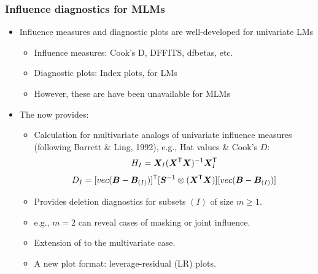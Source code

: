 \begin{frame}
  \frametitle{Influence diagnostics for MLMs}

  \begin{itemize}
  \item<1-> Influence measures and diagnostic plots are well-developed for univariate LMs
    \begin{itemize}
    \item Influence measures: Cook's D, DFFITS, dfbetas, etc.
    \item Diagnostic plots:  Index plots,  for LMs
    \item However, these are have been unavailable for MLMs  
    \end{itemize}
  \item<2->
    The  now provides:
    \begin{itemize}
    \item Calculation for multivariate analogs of univariate influence measures
    (following Barrett \& Ling, 1992), e.g., Hat values \& Cook's $D$:
    \begin{equation}
    	H_I = \bm{X}_I
    	      (\bm{X}^\mathsf{T}\bm{X})^{-1}
    	      \bm{X}_I^\mathsf{T}
    \end{equation}
    \begin{equation}
    	D_I = [vec(\bm{B} - \bm{B}_{(I)})]^\mathsf{T}
    	      [\bm{S}^{-1} \otimes (\bm{X}^\mathsf{T}\bm{X})]
    	      [vec(\bm{B} - \bm{B}_{(I)})]
    \end{equation}
    \item Provides deletion diagnostics for subsets $(I)$ of size $m \ge 1$.
    \item e.g., $m=2$ can reveal cases of \alert{masking} or \alert{joint influence}.
    \item Extension of  to the multivariate case.
    \item A new plot format: \alert{leverage-residual (LR) plots}.
    \end{itemize}
  \end{itemize}
\end{frame}

